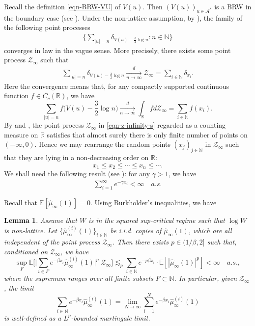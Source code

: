 \documentclass[12pt]{amsart}
\newtheorem{lemma}[theorem]{Lemma}
\theoremstyle{definition}
\theoremstyle{remark}
\newcommand{\R}{\mathbb{R}}
\newcommand{\N}{\mathbb{N}}
\newcommand{\E}{\mathbb{E}}
\newcommand{\Ab}{\mathcal{A}}
\numberwithin{equation}{section}
\begin{document}
Recall the definition 
 \eqref{eqn-BRW-VU} of $V(u)$.  Then $
 (V(u))_{u\in\Ab^*}$   is a BRW in the boundary case  (see  \cite[Chapter 1]{shi-zhan-book}).
 Under the non-lattice assumption, by \cite[Theorem 1.1]{Mad}),  the family of the following point processes 
\begin{align*}
\Big\{\sum_{|u|=n}\delta_{V(u)-\frac{3}{2}\log n}: n\in \N\Big\}
\end{align*}
converges in law in the vague sense. More precisely, there exists some point process $\mathcal{Z}_\infty$ such that
\begin{align}\label{eqn-z-infinity-s}
\sum_{|u|=n}\delta_{V(u)-\frac{3}{2}\log n}\xrightarrow[n \rightarrow\infty]{d} \mathcal{Z}_\infty=\sum_{i\in\N}\delta_{x_i}. 
\end{align}
Here the convergence means that,  for any compactly supported continuous function $f\in C_c(\R)$, we have 
\[
  \sum_{|u|=n}  f\Big( V(u)-\frac{3}{2}\log n\Big) \xrightarrow[ n \rightarrow\infty]{d}   \int_\R f  d\mathcal{Z}_\infty =  \sum_{i\in\N} f(x_i). 
\]
By \cite[Theorem 1.1]{Mad} and \cite[Proposition 2.4]{Iksanov}, the point process $\mathcal{Z}_\infty$ in \eqref{eqn-z-infinity-s}  regarded as a counting measure on $\mathbb{R}$ satisfies that almost surely there is only finite number of points on $(-\infty,0)$. Hence we may rearrange the random points $(x_j)_{j\in\N}$ in $\mathcal{Z}_\infty$ such that they are lying in a non-decreasing order on $\mathbb{R}$: 
\[
x_1 \le x_2\le \cdots \le x_n\le \cdots. 
\]
We shall need the following result (see \cite[formula (5.4)]{Iksanov}):  for any $\gamma>1$, we have 
\begin{align}\label{Z-finite}
\sum_{i=1}^\infty e^{-\gamma x_i}<\infty   \quad   a.s. 
\end{align}


Recall that $\E[\widehat{\mu}_\infty(1)]=0$. Using Burkholder's inequalities, we have 
\begin{lemma}\label{lem-wel-def}
Assume that  $W$  is in the squared sup-critical regime such that $\log W$ is non-lattice.    Let  $\{\widehat{\mu}^{(i)}_\infty(1)\}_{i\in \N}$ be i.i.d. copies of $\widehat{\mu}_\infty(1)$, which are all independent of the point process $\mathcal{Z}_\infty$. 
 Then there exists  $p\in (1/\beta,2]$ such that, conditioned on $\mathcal{Z}_\infty$, we have 
\[
\sup_{F}  \E \Big[ \Big|   \sum_{i \in F}  e^{-\beta x_i}   \widehat{\mu}^{(i)}_\infty(1) \Big|^p  \Big| \mathcal{Z}_\infty\Big]   \lesssim_p \sum_{i \in \N}  e^{- p \beta x_i}   \cdot  \E[ |\widehat{\mu}_\infty(1)|^p]  <\infty \quad a.s. ,
\]
where the supremum ranges over all finite subsets  $F\subset \N$.  In particular,  given $\mathcal{Z}_\infty$,  the limit 
\[
\sum_{i\in \N} e^{-\beta x_i}\widehat{\mu}^{(i)}_\infty(1) = \lim_{N\to\infty} \sum_{i=1}^N e^{-\beta x_i}\widehat{\mu}^{(i)}_\infty(1)
\]
is well-defined as a  $L^p$-bounded martingale limit. 
\end{lemma}
\end{document}
